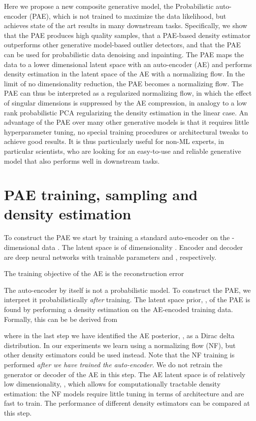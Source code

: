\documentclass{article}
\begin{document}
Here we propose a new composite generative model, the Probabilistic auto-encoder (PAE), which is not trained to maximize the data likelihood, but achieves state of the art results in many downstream tasks. Specifically, we show that the PAE produces high quality samples, that a PAE-based density estimator outperforms other generative model-based outlier detectors, and that the PAE can be used for probabilistic data denoising and inpainting. The PAE maps the data to a lower dimensional latent space with an auto-encoder (AE) and performs density estimation in the latent space of the AE with a normalizing flow. In the limit of no dimensionality reduction, the PAE becomes a normalizing flow. The PAE can thus be interpreted as a regularized normalizing flow, in which the effect of singular dimensions is suppressed by the AE compression, in analogy to a low rank probabilistic PCA regularizing the density estimation in the linear case. 
An advantage of the PAE over many other generative models is that it requires little hyperparameter tuning, no special training procedures or architectural tweaks to achieve good results. It is thus particularly useful for non-ML experts, in particular scientists, who are looking for an easy-to-use and reliable generative model that also performs well in downstream tasks.  
\section{PAE training, sampling and density estimation}
To construct the PAE we start by training a standard auto-encoder on the -dimensional data . The latent space  is of dimensionality . Encoder  and decoder  are deep neural networks with trainable parameters  and , respectively.

The training objective of the AE is the reconstruction error

The auto-encoder by itself is not a probabilistic model. To construct the PAE, we interpret it probabilistically \textit{after} training.
The latent space prior, , of the PAE is found by performing a density estimation on the AE-encoded training data. Formally, this can be be derived from

where in the last step we have identified the AE posterior, , as a Dirac delta distribution. In our experiments we learn  using a normalizing flow (NF), but other density estimators could be used instead. Note that the NF training is performed \textit{after we have trained the auto-encoder}. We do not retrain the generator or decoder of the AE in this step. The AE latent space is of relatively low dimensionality, , which allows for computationally tractable density estimation: the NF models require little tuning in terms of architecture and are fast to train. The performance of different density estimators can be compared at this step.
\end{document}
